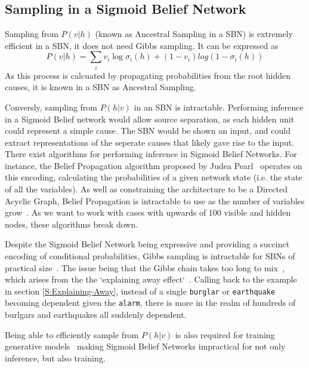 \subsection{Sampling in a Sigmoid Belief Network}


Sampling from $ P(v|h) $ (known as Ancestral Sampling in a SBN) is extremely efficient in a SBN, it does not need Gibbs sampling. It can be expressed as
\begin{equation}\label{eq:SBN-v-given-h}
P(v|h) = \sum_i v_i \log \sigma_i(h) + (1-v_i)log(1-\sigma_i(h))
\end{equation}
As this process is calcuated by propagating probabilities from the root hidden causes, it is known in a SBN as Ancestral Sampling.

Conversly, sampling from $P(h|v)$ in an SBN is intractable. Performing inference in a Sigmoid Belief network would allow source separation, as each hidden unit could represent a simple cause. The SBN would be shown an input, and could extract representations of the seperate causes that likely gave rise to the input. There exist algorithms for performing inference in Sigmoid Belief Networks. For instance, the Belief Propagation algorithm proposed by Judea Pearl~\cite{Pearl1982} operates on this encoding, calculating the probabilities of a given network state (i.e. the state of all the variables). As well as constraining the architecture to be a Directed Acyclic Graph, Belief Propagation is intractable to use as the number of variables grow~\cite{elidan2007using}. As we want to work with cases with upwards of 100 visible and hidden nodes, these algorithms break down.

Despite the Sigmoid Belief Network being expressive and providing a succinct encoding of conditional probabilities, Gibbs sampling is intractable for SBNs of practical size~\cite{Jensen95blockinggibbs}. The issue being that the Gibbs chain takes too long to mix~\cite{neal1992:connectionist}, which arises from the the `explaining away effect`~\cite{Hinton:2006:FLA:1161603.1161605}. Calling back to the example in section \ref{S:Explaining-Away}, instead of a single \texttt{burglar} or \texttt{earthquake} becoming dependent given the \texttt{alarm}, there is more in the realm of hundreds of burlgars and earthquakes all suddenly dependent.

Being able to efficiently sample from $P(h|v)$ is also required for training generative models~\cite{elidan2007using} making Sigmoid Belief Networks impractical for not only inference, but also training.




